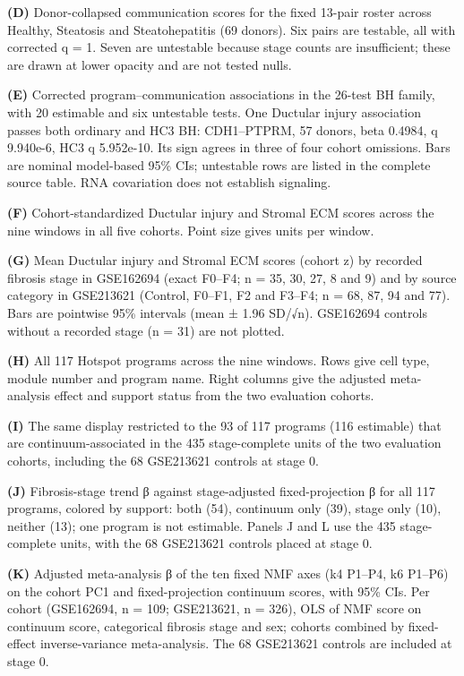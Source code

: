 \textbf{(D)} Donor-collapsed communication scores for the fixed 13-pair roster across Healthy, Steatosis and Steatohepatitis (69 donors). Six pairs are testable, all with corrected q = 1. Seven are untestable because stage counts are insufficient; these are drawn at lower opacity and are not tested nulls.

\textbf{(E)} Corrected program--communication associations in the 26-test BH family, with 20 estimable and six untestable tests. One Ductular injury association passes both ordinary and HC3 BH: CDH1--PTPRM, 57 donors, beta 0.4984, q 9.940e-6, HC3 q 5.952e-10. Its sign agrees in three of four cohort omissions. Bars are nominal model-based 95\% CIs; untestable rows are listed in the complete source table. RNA covariation does not establish signaling.

\textbf{(F)} Cohort-standardized Ductular injury and Stromal ECM scores across the nine windows in all five cohorts. Point size gives units per window.

\textbf{(G)} Mean Ductular injury and Stromal ECM scores (cohort z) by recorded fibrosis stage in GSE162694 (exact F0--F4; n = 35, 30, 27, 8 and 9) and by source category in GSE213621 (Control, F0--F1, F2 and F3--F4; n = 68, 87, 94 and 77). Bars are pointwise 95\% intervals (mean ± 1.96 SD/√n). GSE162694 controls without a recorded stage (n = 31) are not plotted.

\textbf{(H)} All 117 Hotspot programs across the nine windows. Rows give cell type, module number and program name. Right columns give the adjusted meta-analysis effect and support status from the two evaluation cohorts.

\textbf{(I)} The same display restricted to the 93 of 117 programs (116 estimable) that are continuum-associated in the 435 stage-complete units of the two evaluation cohorts, including the 68 GSE213621 controls at stage 0.

\textbf{(J)} Fibrosis-stage trend β against stage-adjusted fixed-projection β for all 117 programs, colored by support: both (54), continuum only (39), stage only (10), neither (13); one program is not estimable. Panels J and L use the 435 stage-complete units, with the 68 GSE213621 controls placed at stage 0.

\textbf{(K)} Adjusted meta-analysis β of the ten fixed NMF axes (k4 P1--P4, k6 P1--P6) on the cohort PC1 and fixed-projection continuum scores, with 95\% CIs. Per cohort (GSE162694, n = 109; GSE213621, n = 326), OLS of NMF score on continuum score, categorical fibrosis stage and sex; cohorts combined by fixed-effect inverse-variance meta-analysis. The 68 GSE213621 controls are included at stage 0.

